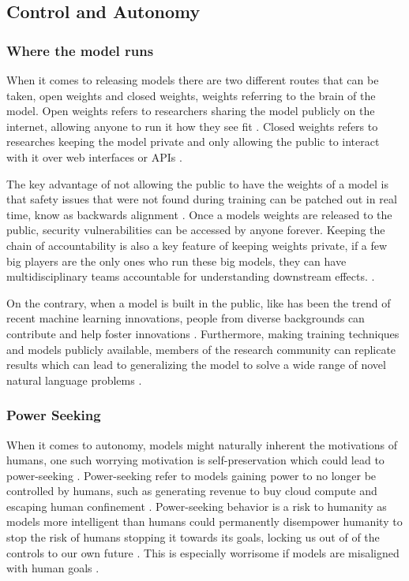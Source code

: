 \subsection{Control and Autonomy}

\subsubsection{Where the model runs}

When it comes to releasing models there are two different routes that can be taken, open weights and closed weights, weights referring to the brain of the model. Open weights refers to researchers sharing the model publicly on the internet, allowing anyone to run it how they see fit \citep{manchanda_open_2025}. Closed weights refers to researches keeping the model private and only allowing the public to interact with it over web interfaces or APIs \citep{manchanda_open_2025}. 

The key advantage of not allowing the public to have the weights of a model is that safety issues that were not found during training can be patched out in real time, know as backwards alignment \citep{ji_ai_2023}. Once a models weights are released to the public, security vulnerabilities can be accessed by anyone forever. Keeping the chain of accountability is also a key feature of keeping weights private, if a few big players are the only ones who run these big models, they can have multidisciplinary teams accountable for understanding downstream effects. \citep{solaiman_gradient_2023}. 

On the contrary, when a model is built in the public, like has been the trend of recent machine learning innovations, people from diverse backgrounds can contribute and help foster innovations \citep{eiras_near_2024}. Furthermore, making training techniques and models publicly available, members of the research community can replicate results which can lead to generalizing the model to solve a wide range of novel natural language problems \citep{manchanda_open_2025}.

\subsubsection{Power Seeking}
When it comes to autonomy, models might naturally inherent the motivations of humans, one such worrying motivation is self-preservation which could lead to power-seeking \citep{bostrom_superintelligent_2012}. Power-seeking refer to models gaining power to no longer be controlled by humans, such as generating revenue to buy cloud compute and escaping human confinement \citep{shevlane_model_2023}. Power-seeking behavior is a risk to humanity as models more intelligent than humans could permanently disempower humanity to stop the risk of humans stopping it towards its goals, locking us out of of the controls to our own future \citep{carlsmith_is_2024}. This is especially worrisome if models are misaligned with human goals \citep{carlsmith_is_2024}. 

